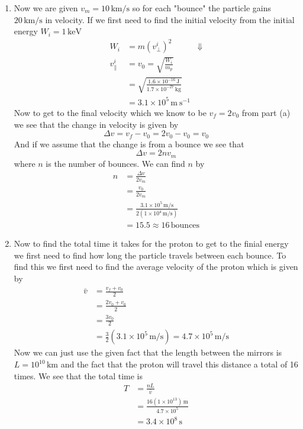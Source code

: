 \documentclass[11pt]{article}
\numberwithin{equation}{section}
\newcommand{\unit}[1]{\ensuremath{\, \mathrm{#1}}}
\begin{document}
\begin{enumerate}[(a)]
\begin{enumerate}[1)]
\item
Now we are given $v_m=10\unit{km/s}$ so for each "bounce" the particle gains $20\unit{km/s}$ in velocity. If we first need to find the initial velocity from the initial energy $W_i = 1\unit{keV}$
\begin{align*}
W_i &= m(v^i_{\perp})^2
&\Downarrow\\
v^i_{\parallel} &= v_0 = \sqrt{\frac{W_i}{m_p}}\\
&= \sqrt{\frac{1.6\times10^{-16}\unit{J}}{1.7\times10^{-27}\unit{kg}}}\\
&= 3.1\times10^{5}\unit{m\ s^{-1}}
\end{align*}
Now to get to the final velocity which we know to be $v_f = 2v_0$ from part (a) we see that the change in velocity is given by 
$$\Delta v = v_f - v_0 = 2v_0 - v_0 = v_0$$
And if we assume that the change is from a bounce we see that 
$$\Delta v = 2nv_m$$
where $n$ is the number of bounces. We can find $n$ by
\begin{align*}
n &= \frac{\Delta v}{2v_m}\\
&= \frac{v_0}{2v_m}\\
&= \frac{3.1\times10^{5}\unit{m/s}}{2(1\times10^{4}\unit{m/s})}\\
&= 15.5 \approx 16 \unit{bounces}
\end{align*}

\item
Now to find the total time it takes for the proton to get to the finial energy we first need to find how long the particle travels between each bounce. To find this we first need to find the average velocity of the proton which is given by
\begin{align*}
\bar{v} &= \frac{v_f + v_0}{2}\\
&= \frac{2v_0 +v_0}{2}\\
&= \frac{3v_0}{2}\\
&= \frac{3}{2}(3.1\times10^{5}\unit{m/s}) = 4.7\times10^{5}\unit{m/s}
\end{align*}
Now we can just use the given fact that the length between the mirrors is $L=10^10\unit{km}$ and the fact that the proton will travel this distance a total of 16 times. We see that the total time is 
\begin{align*}
T &= \frac{nL}{\bar{v}} \\
&= \frac{16(1\times10^{13})\unit{m}}{4.7\times10^{5}}\\
&= 3.4\times10^8\unit{s}
\end{align*}
\end{enumerate}
\end{enumerate}
\end{document}
